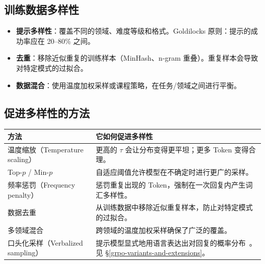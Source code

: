 \subsection{训练数据多样性}
\label{training-data-diversity}

\begin{itemize}
  \item \textbf{提示多样性}：覆盖不同的领域、难度等级和格式。Goldilocks 原则：提示的成功率应在 20--80\% 之间。
  \item \textbf{去重}：移除近似重复的训练样本（MinHash、n-gram 重叠）。重复样本会导致对特定模式的过拟合。
  \item \textbf{数据混合}：使用温度加权采样或课程策略，在任务/领域之间进行平衡。
\end{itemize}

\subsection{促进多样性的方法}
\label{diversity-promoting-methods}

\noindent\begin{tabularx}{\linewidth}{@{}l Z{1}@{}}
\toprule
\textbf{方法} & \textbf{它如何促进多样性} \\
\midrule
温度缩放（Temperature scaling） & 更高的 $\tau$ 会让分布变得更平坦；更多 Token 变得合理。 \\
Top-$p$ / Min-$p$ & 自适应阈值允许模型在不确定时进行更广的采样。 \\
频率惩罚（Frequency penalty） & 惩罚重复出现的 Token，强制在一次回复内产生词汇多样性。 \\
数据去重 & 从训练数据中移除近似重复样本，防止对特定模式的过拟合。 \\
多领域混合 & 跨领域的温度加权采样确保了广泛的覆盖。 \\
口头化采样（Verbalized sampling） & 提示模型显式地用语言表达出对回复的概率分布~\cite{zhang2025verbalized}。见 §\ref{grpo-variants-and-extensions}。 \\
\bottomrule
\end{tabularx}


